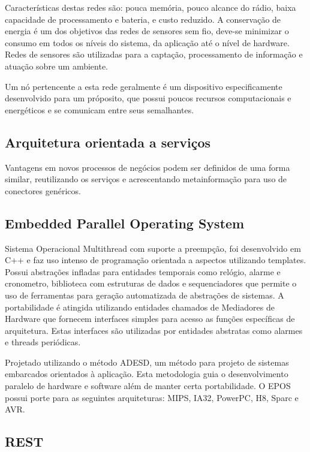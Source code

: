 Caracter\'isticas destas redes são: pouca mem\'oria, pouco alcance do r\'adio, baixa capacidade de processamento e bateria, e custo reduzido. A conservação de energia \'e um dos objetivos das redes de sensores sem fio, deve-se minimizar o consumo em todos os n\'iveis do sistema, da aplicação at\'e o n\'ivel de hardware. Redes de sensores são utilizadas para a captação, processamento de informação e atuação sobre um ambiente.

Um n\'o pertencente a esta rede geralmente \'e um dispositivo especificamente desenvolvido para um pr\'oposito, que possui poucos recursos computacionais e energ\'eticos e se comunicam entre seus semalhantes.

\subsection{Arquitetura orientada a serviços}
Vantagens em novos processos de neg\'ocios podem ser definidos de uma forma similar, reutilizando os serviços e acrescentando metainformação para uso de conectores gen\'ericos.
\cite{perrey2003service}

\subsection{Embedded Parallel Operating System}
Sistema Operacional Multithread com suporte a preempção, foi desenvolvido em C++ e faz uso intenso de programação orientada a aspectos utilizando templates.
Possui abstraç\~oes infladas para entidades temporais como rel\'ogio, alarme e cronometro, biblioteca com estruturas de dados e sequenciadores que permite o uso de ferramentas para geração automatizada de abstraç\~oes de sistemas. A portabilidade \'e atingida utilizando entidades chamados de Mediadores de Hardware que fornecem interfaces simples para acesso as funç\~oes espec\'ificas de arquitetura. Estas interfaces são utilizadas por entidades abstratas como alarmes e threads peri\'odicas.

Projetado utilizando o m\'etodo ADESD, um m\'etodo para projeto de sistemas embarcados orientados à aplicação. Esta metodologia guia o desenvolvimento paralelo de hardware e software al\'em de manter certa portabilidade. O EPOS possui porte para as seguintes arquiteturas: MIPS, IA32, PowerPC, H8, Sparc e AVR.

\cite{epos}


\subsection{REST}

